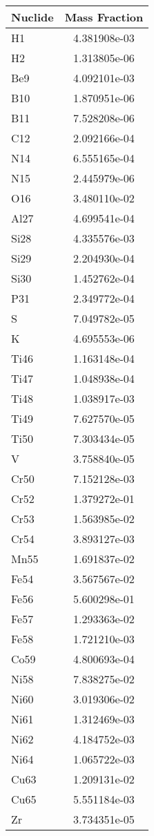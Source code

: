 \begin{centering}
\begin{table}[ht!]
\begin{tabular}{l | c}
\hline
Nuclide & Mass Fraction\\
\hline
H1 & 4.381908e-03\\
H2 & 1.313805e-06\\
Be9 & 4.092101e-03\\
B10 & 1.870951e-06\\
B11 & 7.528208e-06\\
C12 & 2.092166e-04\\
N14 & 6.555165e-04\\
N15 & 2.445979e-06\\
O16 & 3.480110e-02\\
Al27 & 4.699541e-04\\
Si28 & 4.335576e-03\\
Si29 & 2.204930e-04\\
Si30 & 1.452762e-04\\
P31 & 2.349772e-04\\
S & 7.049782e-05\\
K & 4.695553e-06\\
Ti46 & 1.163148e-04\\
Ti47 & 1.048938e-04\\
Ti48 & 1.038917e-03\\
Ti49 & 7.627570e-05\\
Ti50 & 7.303434e-05\\
V & 3.758840e-05\\
Cr50 & 7.152128e-03\\
Cr52 & 1.379272e-01\\
Cr53 & 1.563985e-02\\
Cr54 & 3.893127e-03\\
Mn55 & 1.691837e-02\\
Fe54 & 3.567567e-02\\
Fe56 & 5.600298e-01\\
Fe57 & 1.293363e-02\\
Fe58 & 1.721210e-03\\
Co59 & 4.800693e-04\\
Ni58 & 7.838275e-02\\
Ni60 & 3.019306e-02\\
Ni61 & 1.312469e-03\\
Ni62 & 4.184752e-03\\
Ni64 & 1.065722e-03\\
Cu63 & 1.209131e-02\\
Cu65 & 5.551184e-03\\
Zr & 3.734351e-05\\

\end{tabular}
\end{table}
\end{centering}
